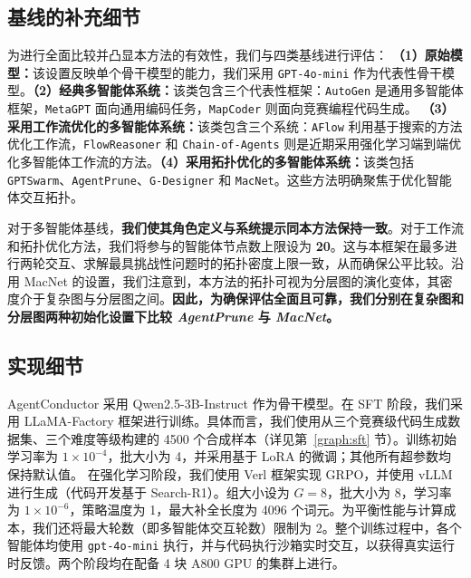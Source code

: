 \documentclass{article}
\theoremstyle{definition}
\begin{document}
\subsection{基线的补充细节}
\label{appendix:baselines}
为进行全面比较并凸显本方法的有效性，我们与四类基线进行评估：
\textbf{（1）原始模型：}该设置反映单个骨干模型的能力，我们采用 \texttt{GPT-4o-mini} 作为代表性骨干模型。\textbf{（2）经典多智能体系统：}该类包含三个代表性框架：\texttt{AutoGen}\citep{wu2024autogen} 是通用多智能体框架，\texttt{MetaGPT}\citep{hong2024metagpt} 面向通用编码任务，\texttt{MapCoder}\citep{islam2024mapcoder} 则面向竞赛编程代码生成。
\textbf{（3）采用工作流优化的多智能体系统：}该类包含三个系统：\texttt{AFlow}\citep{zhang2024aflow} 利用基于搜索的方法优化工作流，\texttt{FlowReasoner}\citep{gao2025flowreasoner} 和 \texttt{Chain-of-Agents} 则是近期采用强化学习端到端优化多智能体工作流的方法。\textbf{（4）采用拓扑优化的多智能体系统：}该类包括 \texttt{GPTSwarm}\citep{zhuge2024gptswarm}、\texttt{AgentPrune}\citep{zhang2024cut}、\texttt{G-Designer}\citep{zhang2024g} 和 \texttt{MacNet}\citep{qian2024scaling}。这些方法明确聚焦于优化智能体交互拓扑。

对于多智能体基线，\textbf{我们使其角色定义与系统提示同本方法保持一致}。对于工作流和拓扑优化方法，我们将参与的智能体节点数上限设为 \textbf{20}。这与本框架在最多进行两轮交互、求解最具挑战性问题时的拓扑密度上限一致，从而确保公平比较。沿用 MacNet 的设置，我们注意到，本方法的拓扑可视为分层图的演化变体，其密度介于复杂图与分层图之间。\textbf{因此，为确保评估全面且可靠，我们分别在复杂图和分层图两种初始化设置下比较 \textit{AgentPrune} 与 \textit{MacNet}。}
\subsection{实现细节}
\label{appendix:Implementation Details}
AgentConductor 采用 Qwen2.5-3B-Instruct\citep{qwen2.5} 作为骨干模型。在 SFT 阶段，我们采用 LLaMA-Factory 框架\citep{zheng2024llamafactory}进行训练。具体而言，我们使用从三个竞赛级代码生成数据集、三个难度等级构建的 4500 个合成样本（详见第~\ref{graph:sft} 节）。训练初始学习率为 $1 \times 10^{-4}$，批大小为 4，并采用基于 LoRA 的微调；其他所有超参数均保持默认值。
在强化学习阶段，我们使用 Verl 框架\citep{sheng2025hybridflow}实现 GRPO，并使用 vLLM 进行生成（代码开发基于 Search-R1\citep{jin2025search}）。组大小设为 $G=8$，批大小为 8，学习率为 $1 \times 10^{-6}$，策略温度为 1，最大补全长度为 4096 个词元。为平衡性能与计算成本，我们还将最大轮数（即多智能体交互轮数）限制为 2。整个训练过程中，各个智能体均使用 \texttt{gpt-4o-mini} 执行，并与代码执行沙箱实时交互，以获得真实运行时反馈。两个阶段均在配备 4 块 A800 GPU 的集群上进行。
\end{document}
